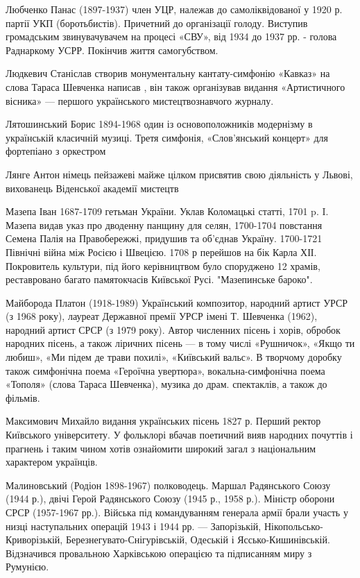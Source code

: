 Любченко Панас (1897-1937) член УЦР, належав до самоліквідованої у 1920 р. партії УКП (боротьбистів). Причетний до організації голоду. Виступив громадським звинувачувачем на процесі «СВУ», від 1934 до 1937 рр. - голова Раднаркому УСРР. Покінчив життя самогубством.

Людкевич Станіслав створив монументальну кантату-симфонію «Кавказ» на слова Тараса Шевченка написав , він також організував видання «Артистичного вісника» --- першого українського мистецтвознавчого журналу. 

Лятошинський Борис 1894-1968 один із основоположників модернізму в українській класичній музиці.  Третя симфонія, «Слов’янський концерт» для фортепіано з оркестром

Лянге Антон  німець  пейзажеві майже цілком присвятив свою діяльність у Львові, вихованець Віденської академії мистецтв  

Мазепа  Іван 1687-1709 гетьман України. Уклав Коломацькі статті, 1701 p. I. Мазепа видав указ про дводенну панщину для селян, 1700-1704 повстання Семена Палія на Правобережжі, придушив та об’єднав Україну. 1700-1721 Північні війна між Росією і Швецією. 1708 р перейшов на бік Карла ХІІ. Покровитель культури, під його керівництвом було споруджено 12 храмів, реставровано багато памятокчасів Київської Русі. "Мазепинське бароко".

Майборода Платон (1918-1989) Український композитор, народний артист УРСР (з 1968 року), лауреат Державної премії УРСР імені Т. Шевченка (1962), народний артист СРСР (з 1979 року). Автор численних пісень і хорів, обробок народних пісень, а також ліричних пісень --- в тому числі «Рушничок», «Якщо ти любиш», «Ми підем де трави похилі», «Київський вальс». В творчому доробку також симфонічна поема «Героїчна увертюра», вокальна-симфонічна поема «Тополя» (слова Тараса Шевченка), музика до драм. спектаклів, а також до фільмів.

Максимович Михайло видання українських пісень 1827 р. Перший ректор Київського університету. У фольклорі вбачав поетичний вияв народних почуттів і прагнень і таким чином хотів ознайомити широкий загал з національним характером українців.

Малиновський (Родіон 1898-1967) полководець. Маршал Радянського Союзу (1944 р.), двічі Герой Радянського Союзу (1945 р., 1958 р.). Міністр оборони СРСР (1957-1967 рр.). Війська під командуванням генерала армії брали участь у низці наступальних операцій 1943 і 1944 рр. --- Запорізькій, Нікопольсько-Криворізькій, Березнегувато-Снігурівській, Одеській і Яссько-Кишинівській. Відзначився провальною Харківською операцією та підписанням миру з Румунією. 

